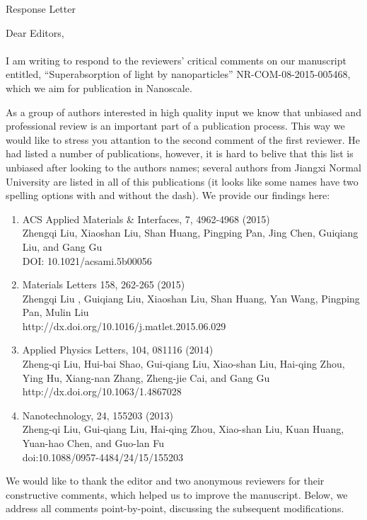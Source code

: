 \documentclass[a4paper]{article}
\begin{document}
\begin{center}
  Response Letter
\end{center}
Dear Editors,
\\
\\
I am writing to respond to the reviewers' critical comments on our
manuscript entitled, ``Superabsorption of light by nanoparticles''
NR-COM-08-2015-005468, which we aim for publication in Nanoscale.

As a group of authors interested in high quality input we know that
unbiased and professional review is an important part of a publication
process.  This way we would like to stress you attantion to the second
comment of the first reviewer. He had listed a number of publications,
however, it is hard to belive that this list is unbiased after looking
to the authors names; several authors from Jiangxi Normal University are
listed in all of this publications (it looks like some names have two
spelling options with and without the dash).  We provide our findings here:
\begin{enumerate}
\item ACS Applied Materials & Interfaces, 7, 4962-4968 (2015)\\
  Zhengqi Liu, Xiaoshan Liu,  Shan Huang,  Pingping Pan,  Jing Chen,
  Guiqiang Liu, and Gang Gu\\
  DOI: 10.1021/acsami.5b00056
\item Materials Letters 158, 262-265 (2015)\\
  Zhengqi Liu , Guiqiang Liu, Xiaoshan Liu, Shan Huang, Yan Wang,
  Pingping Pan, Mulin Liu\\
  http://dx.doi.org/10.1016/j.matlet.2015.06.029
\item Applied Physics Letters, 104, 081116 (2014)\\
  Zheng-qi Liu, Hui-bai Shao,  Gui-qiang Liu, Xiao-shan Liu, Hai-qing Zhou, Ying Hu,
  Xiang-nan Zhang, Zheng-jie Cai, and Gang Gu\\
  http://dx.doi.org/10.1063/1.4867028
\item Nanotechnology, 24, 155203 (2013)\\
  Zheng-qi Liu, Gui-qiang Liu, Hai-qing Zhou, Xiao-shan Liu,
  Kuan Huang, Yuan-hao Chen, and Guo-lan Fu\\
  doi:10.1088/0957-4484/24/15/155203
\end{enumerate}

We would like to thank the editor and two anonymous reviewers for their
constructive comments, which helped us to improve the
manuscript. Below, we address all comments point-by-point, discussing
the subsequent modifications.
\end{document}
